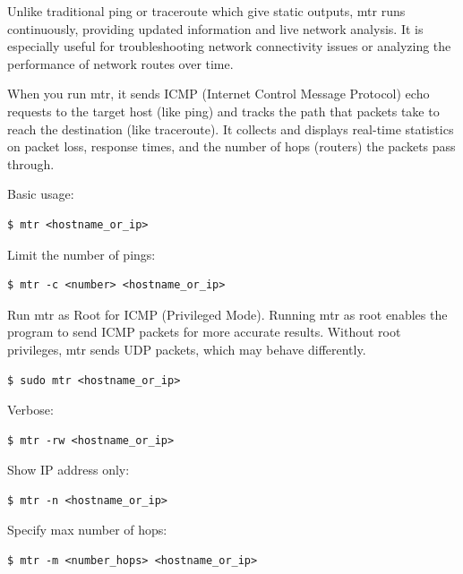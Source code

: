 \documentclass{article}
\newenvironment{codetemplate}[1][]{%
  \mybasecolorbox[#1]
  \itshape
}{%
  \endmybasecolorbox
}
\begin{document}
Unlike traditional ping or traceroute which give static outputs, mtr runs continuously, providing updated information and live network analysis. It is especially useful for troubleshooting network connectivity issues or analyzing the performance of network routes over time.

When you run mtr, it sends ICMP (Internet Control Message Protocol) echo requests to the target host (like ping) and tracks the path that packets take to reach the destination (like traceroute). It collects and displays real-time statistics on packet loss, response times, and the number of hops (routers) the packets pass through.

Basic usage:
\begin{codetemplate}{}
\begin{verbatim}
$ mtr <hostname_or_ip>
\end{verbatim}
\end{codetemplate}

Limit the number of pings:
\begin{codetemplate}{}
\begin{verbatim}
$ mtr -c <number> <hostname_or_ip>
\end{verbatim}
\end{codetemplate}

Run mtr as Root for ICMP (Privileged Mode). Running mtr as root enables the program to send ICMP packets for more accurate results. Without root privileges, mtr sends UDP packets, which may behave differently.
\begin{codetemplate}{}
\begin{verbatim}
$ sudo mtr <hostname_or_ip>
\end{verbatim}
\end{codetemplate}

Verbose:
\begin{codetemplate}{}
\begin{verbatim}
$ mtr -rw <hostname_or_ip>
\end{verbatim}
\end{codetemplate}

Show IP address only:
\begin{codetemplate}{}
\begin{verbatim}
$ mtr -n <hostname_or_ip>
\end{verbatim}
\end{codetemplate}

Specify max number of hops:
\begin{codetemplate}{}
\begin{verbatim}
$ mtr -m <number_hops> <hostname_or_ip>
\end{verbatim}
\end{codetemplate}
\end{document}
